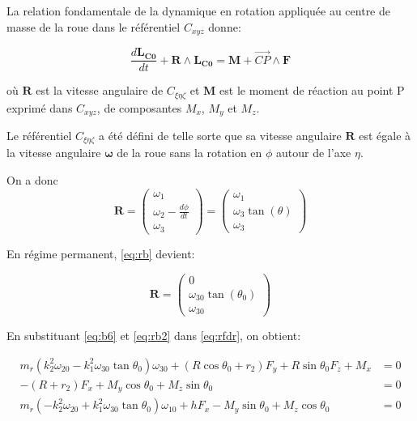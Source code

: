 La relation fondamentale de la dynamique en rotation appliquée au centre de masse de la roue dans le référentiel $C_{xyz}$ donne:

\begin{equation}
    \frac{d \mathbf{L_{C0}}}{dt} + \mathbf{R} \wedge \mathbf{L_{C0}} = \mathbf{M}+ \overrightarrow{CP} \wedge \mathbf{F} 
\label{eq:rfdr}
\end{equation}

où $\mathbf{R}$ est la vitesse angulaire de $C_{\xi \eta \zeta}$ et $\mathbf{M}$ est le moment de réaction au point P exprimé dans $C_{xyz}$, de composantes $M_x$, $M_y$ et $M_z$.

Le référentiel $C_{\xi \eta \zeta}$ a été défini de telle sorte que sa vitesse angulaire $\mathbf{R}$ est égale à la vitesse angulaire $\mathbf{\omega}$ de la roue sans la rotation en $\phi$ autour de l'axe $\eta$.

On a donc
\begin{equation}
   \mathbf{R}= \begin{pmatrix}
    \omega_1  \\
    \omega_2 - \frac{d\phi}{dt} \\
    \omega_3     
\end{pmatrix} 
=
\begin{pmatrix}
    \omega_1  \\
    \omega_{3}\tan(\theta) \\
    \omega_3     
\end{pmatrix} 
\label{eq:rb}
\end{equation}

En régime permanent, \ref{eq:rb} devient:

\begin{equation}
   \mathbf{R}= \begin{pmatrix}
    0  \\
    \omega_{30}\tan(\theta_0) \\
    \omega_{30}     
\end{pmatrix} 
\label{eq:rb2}
\end{equation}

En substituant \ref{eq:b6} et \ref{eq:rb2} dans \ref{eq:rfdr}, on obtient:

\begin{align}
    m_r(k_2^2\omega_{20}-k_1^2\omega_{30} \tan{\theta_0})\omega_{30} +(R\cos{\theta_0}+r_2)F_y + R\sin{\theta_0}F_z + M_x &=0 \nonumber\\
    -(R+r_2)F_x + M_y \cos{\theta_0} +M_z \sin{\theta_0}&=0 \nonumber\\
    m_r(-k_2^2\omega_{20}+k_1^2\omega_{30} \tan{\theta_0})\omega_{10} + hF_x - M_y \sin{\theta_0} +M_z \cos{\theta_0}&=0
  \label{eq:b8}
\end{align}

